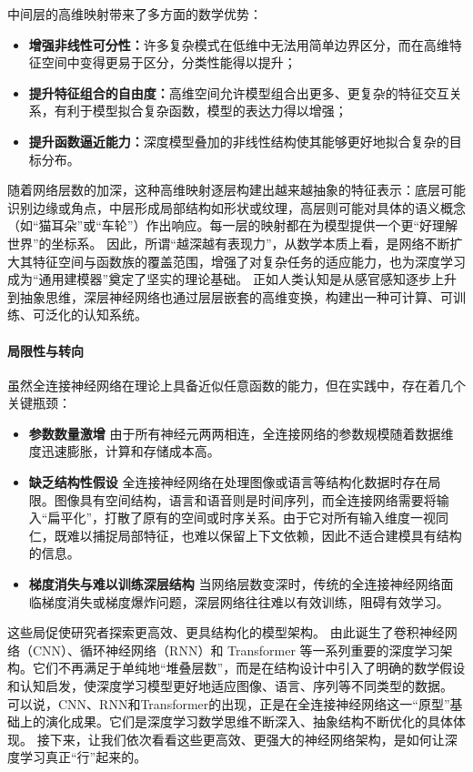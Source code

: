 中间层的高维映射带来了多方面的数学优势：
\begin{itemize}
\item {\bf  增强非线性可分性：}许多复杂模式在低维中无法用简单边界区分，而在高维特征空间中变得更易于区分，分类性能得以提升；
\item {\bf  提升特征组合的自由度：}高维空间允许模型组合出更多、更复杂的特征交互关系，有利于模型拟合复杂函数，模型的表达力得以增强；
\item {\bf  提升函数逼近能力：}深度模型叠加的非线性结构使其能够更好地拟合复杂的目标分布。
\end{itemize}
随着网络层数的加深，这种高维映射逐层构建出越来越抽象的特征表示：底层可能识别边缘或角点，中层形成局部结构如形状或纹理，高层则可能对具体的语义概念（如“猫耳朵”或“车轮”）作出响应。每一层的映射都在为模型提供一个更“好理解世界”的坐标系。
因此，所谓“越深越有表现力”，从数学本质上看，是网络不断扩大其特征空间与函数族的覆盖范围，增强了对复杂任务的适应能力，也为深度学习成为“通用建模器”奠定了坚实的理论基础。
正如人类认知是从感官感知逐步上升到抽象思维，深层神经网络也通过层层嵌套的高维变换，构建出一种可计算、可训练、可泛化的认知系统。
\paragraph*{局限性与转向}
虽然全连接神经网络在理论上具备近似任意函数的能力，但在实践中，存在着几个关键瓶颈：
\begin{itemize}
\item {\bf  参数数量激增}
  由于所有神经元两两相连，全连接网络的参数规模随着数据维度迅速膨胀，计算和存储成本高。
\item {\bf  缺乏结构性假设}
全连接神经网络在处理图像或语言等结构化数据时存在局限。图像具有空间结构，语言和语音则是时间序列，而全连接网络需要将输入“扁平化”，打散了原有的空间或时序关系。由于它对所有输入维度一视同仁，既难以捕捉局部特征，也难以保留上下文依赖，因此不适合建模具有结构的信息。
\item {\bf  梯度消失与难以训练深层结构}
  当网络层数变深时，传统的全连接神经网络面临梯度消失或梯度爆炸问题，深层网络往往难以有效训练，阻碍有效学习。
\end{itemize}
这些局促使研究者探索更高效、更具结构化的模型架构。 由此诞生了卷积神经网络（CNN）、循环神经网络（RNN）和 Transformer 等一系列重要的深度学习架构。它们不再满足于单纯地“堆叠层数”，而是在结构设计中引入了明确的数学假设和认知启发，使深度学习模型更好地适应图像、语言、序列等不同类型的数据。
可以说，CNN、RNN和Transformer的出现，正是在全连接神经网络这一“原型”基础上的演化成果。它们是深度学习数学思维不断深入、抽象结构不断优化的具体体现。
接下来，让我们依次看看这些更高效、更强大的神经网络架构，是如何让深度学习真正“行”起来的。
